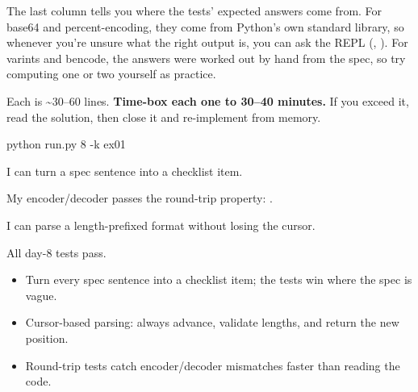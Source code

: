 \documentclass[10pt,a4paper]{article}
\begin{document}
The last column tells you where the tests’ expected answers come from. For base64 and percent-encoding, they come from Python’s own standard library, so whenever you’re unsure what the right output is, you can ask the REPL (, ). For varints and bencode, the answers were worked out by hand from the spec, so try computing one or two yourself as practice.
\begin{tipbox}
Each is \textasciitilde{}30–60 lines. \textbf{Time-box each one to 30–40 minutes.} If you exceed it, read the solution, then close it and re-implement from memory.
\end{tipbox}
\begin{shcode}
python run.py 8 -k ex01
\end{shcode}
\begin{checklistbox}
\begin{checklist}
\item I can turn a spec sentence into a checklist item.
\item My encoder/decoder passes the round-trip property: .
\item I can parse a length-prefixed format without losing the cursor.
\item All day-8 tests pass.
\end{checklist}
\scoreline
\end{checklistbox}
\begin{examlensbox}
\begin{itemize}
\item Turn every spec sentence into a checklist item; the tests win where the spec is vague.
\item Cursor-based parsing: always advance, validate lengths, and return the new position.
\item Round-trip tests catch encoder/decoder mismatches faster than reading the code.
\end{itemize}
\end{examlensbox}
\bugjournalifspace
\end{document}
